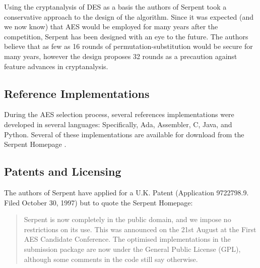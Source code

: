 \documentclass{article}
\begin{document}
Using the cryptanalysis of DES as a basis the authors of Serpent took a conservative approach to the design of the algorithm.\cite{wikipedia} Since it was expected (and we now know) that AES would be employed for many years after the competition, Serpent has been designed with an eye to the future. The authors believe that as few as 16 rounds of permutation-substitution would be secure for many years, however the design proposes 32 rounds as a precaution against feature advances in cryptanalysis. \cite[4, 8]{submission}

\subsection{Reference Implementations}

During the AES selection process, several references implementations were developed in several languages: Specifically, Ada, Assembler, C, Java, and Python.\cite[16]{submission} Several of these implementations are available for download from the Serpent Homepage \cite{homepage}.

\subsection{Patents and Licensing}

The authors of Serpent have applied for a U.K. Patent (Application 9722798.9. Filed October 30, 1997) \cite{scan} but to quote the Serpent Homepage:
\blockquote{Serpent is now completely in the public domain, and we impose no restrictions on its use. This was announced on the 21st August at the First AES Candidate Conference. The optimised implementations in the submission package are now under the General Public License (GPL), although some comments in the code still say otherwise.}\cite{homepage}

\nocite{referenceimplementation}
\nocite{case}

\printbibliography
\end{document}
